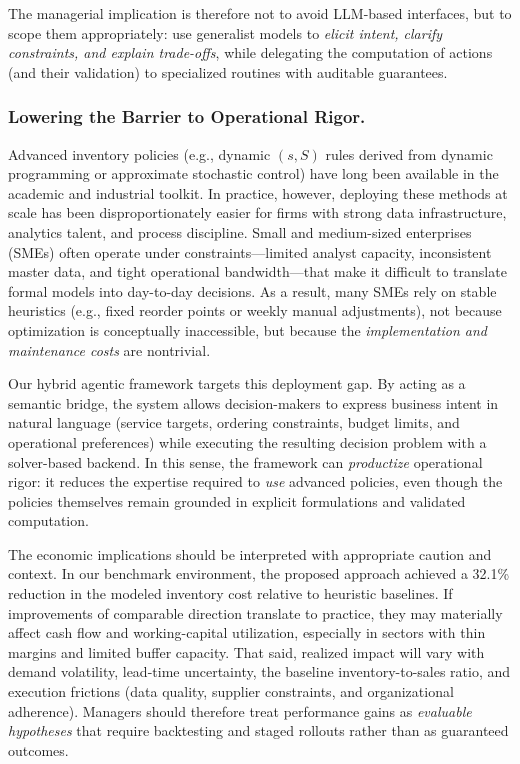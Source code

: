 The managerial implication is therefore not to avoid LLM-based interfaces, but to scope them appropriately: use generalist models to \emph{elicit intent, clarify constraints, and explain trade-offs}, while delegating the computation of actions (and their validation) to specialized routines with auditable guarantees.






\subsubsection*{Lowering the Barrier to Operational Rigor.}
Advanced inventory policies (e.g., dynamic $(s, S)$ rules derived from dynamic programming or approximate stochastic control) have long been available in the academic and industrial toolkit. In practice, however, deploying these methods at scale has been disproportionately easier for firms with strong data infrastructure, analytics talent, and process discipline. Small and medium-sized enterprises (SMEs) often operate under constraints---limited analyst capacity, inconsistent master data, and tight operational bandwidth---that make it difficult to translate formal models into day-to-day decisions. As a result, many SMEs rely on stable heuristics (e.g., fixed reorder points or weekly manual adjustments), not because optimization is conceptually inaccessible, but because the \emph{implementation and maintenance costs} are nontrivial.

Our hybrid agentic framework targets this deployment gap. By acting as a semantic bridge, the system allows decision-makers to express business intent in natural language (service targets, ordering constraints, budget limits, and operational preferences) while executing the resulting decision problem with a solver-based backend. In this sense, the framework can \emph{productize} operational rigor: it reduces the expertise required to \emph{use} advanced policies, even though the policies themselves remain grounded in explicit formulations and validated computation.

The economic implications should be interpreted with appropriate caution and context. In our benchmark environment, the proposed approach achieved a 32.1\% reduction in the modeled inventory cost relative to heuristic baselines. If improvements of comparable direction translate to practice, they may materially affect cash flow and working-capital utilization, especially in sectors with thin margins and limited buffer capacity. That said, realized impact will vary with demand volatility, lead-time uncertainty, the baseline inventory-to-sales ratio, and execution frictions (data quality, supplier constraints, and organizational adherence). Managers should therefore treat performance gains as \emph{evaluable hypotheses} that require backtesting and staged rollouts rather than as guaranteed outcomes.

